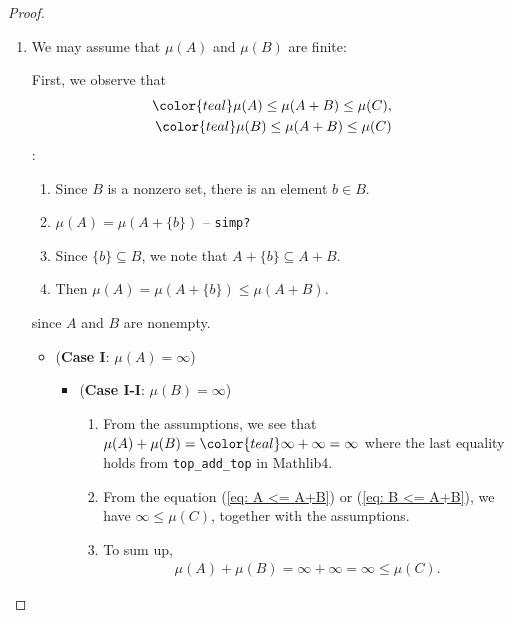 \begin{proof}
    \begin{enumerate}
        \item We may assume that \(\mu(A)\) and \(\mu(B)\) are finite:
        
        First, we observe that 
        \begin{eqnarray}
            {\color{teal}\mu(A) \leq \mu(A+B)} \leq \mu(C), \label{eq: A <= A+B}\\
            {\color{teal}\mu(B) \leq \mu(A+B)} \leq \mu(C) \label{eq: B <= A+B}
        \end{eqnarray}
        :\begin{enumerate}
            \item Since \(B\) is a nonzero set, there is an element \(b \in B\).
            \item \(\mu(A) =\mu(A+\{b\})\) -- \texttt{simp?}
            \item Since \(\{b\} \subseteq B\), we note that \(A + \{b\} \subseteq A + B\).
            \item Then \(\mu(A) = \mu(A + \{b\}) \leq \mu(A+B)\).
        \end{enumerate}
        since \(A\) and \(B\) are nonempty.
        \begin{itemize}
            \item (\textbf{Case I}: \(\mu(A)=\infty\)) 
            \begin{itemize}
                \item (\textbf{Case I-I}: \(\mu(B) = \infty\))  
                \begin{enumerate}
                    \item From the assumptions, we see that \(\mu(A) + \mu(B) = {\color{teal}\infty + \infty = \infty}\) where the last equality holds from \texttt{top\_add\_top} in Mathlib4. 
                    \item From the equation (\ref{eq: A <= A+B}) or (\ref{eq: B <= A+B}), we have \(\infty \leq \mu(C)\), together with the assumptions.
                    \item To sum up,
                    \begin{eqnarray*}
                        \mu(A) + \mu (B) = \infty + \infty = \infty \leq \mu(C).
                    \end{eqnarray*}
                \end{enumerate}


\end{itemize}
\end{itemize}
\end{enumerate}
\end{proof}
